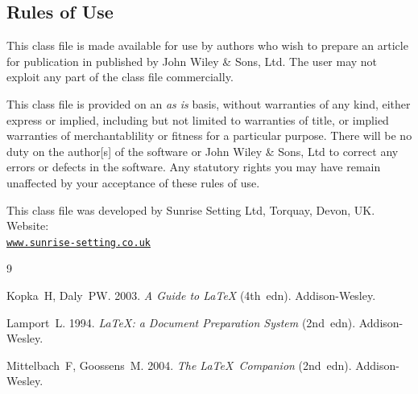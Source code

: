 \documentclass[times]{weauth}
\begin{document}
\subsection{Rules of Use}
This class file is made available for use by authors who wish to
prepare an article for publication in \emph{\journalnamelc}
published by John Wiley \& Sons, Ltd. The user may not exploit any
part of the class file commercially.

This class file is provided on an \emph{as is}  basis, without
warranties of any kind, either express or implied, including but
not limited to warranties of title, or implied  warranties of
merchantablility or fitness for a particular purpose. There will
be no duty on the author[s] of the software or  John Wiley \&
Sons, Ltd to correct any errors or defects in the software. Any
statutory  rights you may have remain unaffected by your
acceptance of these rules of use.

\ack This class file was developed by Sunrise Setting Ltd,
Torquay, Devon, UK. Website:\\
\href{http://www.sunrise-setting.co.uk}{\texttt{www.sunrise-setting.co.uk}}

\begin{thebibliography}{9}

 Kopka~H, Daly~PW. 2003. \emph{A Guide to \LaTeX} (4th~edn).
Addison-Wesley.

 Lamport~L. 1994. \emph{\LaTeX: a Document Preparation System} (2nd~edn).
Addison-Wesley.

 Mittelbach~F, Goossens~M. 2004. \emph{The \LaTeX\ Companion}
(2nd~edn). Addison-Wesley.
\end{thebibliography}
\end{document}
